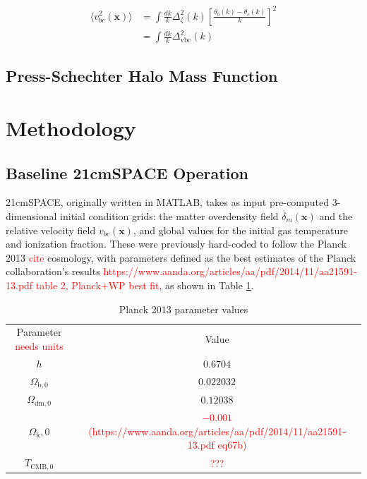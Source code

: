 \documentclass[floats,floatfix,showpacs,amssymb,prd,superscriptaddress,nofootinbib]{revtex4-2} %
\newcommand{\red}{\textcolor{red}}
\begin{document}
\begin{equation}
\begin{split}
        \langle v_{bc}^2 (\textbf{x}) \rangle 
        & = \int \frac{dk}{k} \Delta_\zeta^2 (k) \left[ \frac{\theta_b (k) - \theta_c (k)}{k} \right]^2 \\
        & = \int \frac{dk}{k} \Delta_{\text{vbc}}^2 (k)
\end{split}
\end{equation}

\subsection{Press-Schechter Halo Mass Function}



\newpage
\section{Methodology}
\subsection{Baseline 21cmSPACE Operation}
21cmSPACE, originally written in MATLAB, takes as input pre-computed 3-dimensional initial condition grids: the matter overdensity field $\delta_m(\textbf{x})$ and the relative velocity field $v_{bc}(\textbf{x})$, and global values for the initial gas temperature and ionization fraction. These were previously hard-coded to follow the Planck 2013 \red{cite} cosmology, with parameters defined as the best estimates of the Planck collaboration's results \red{https://www.aanda.org/articles/aa/pdf/2014/11/aa21591-13.pdf table 2, Planck+WP best fit}, as shown in Table \ref{tab:Planck13_parameter_values}. 


\begin{table}[!h]
    \centering
    \begin{tabular}{|c|c|}
        \hline
        Parameter \red{needs units} & Value\\ \hhline{|=|=|}
        $h$ & $0.6704$\\ \hline
        $\Omega_{\text{b}, 0}$ & $0.022032$\\ \hline
        $\Omega_{\text{dm}, 0}$ & $0.12038$\\ \hline
        $\Omega_{\text{k}}, 0$ & \red{$-0.001$(https://www.aanda.org/articles/aa/pdf/2014/11/aa21591-13.pdf eq67b)}\\ \hline
        $T_{\text{CMB},0}$ & \red{???} \\ \hline
    \end{tabular}
    \caption{Planck 2013 parameter values}
    \label{tab:Planck13_parameter_values}
\end{table}
\end{document}
